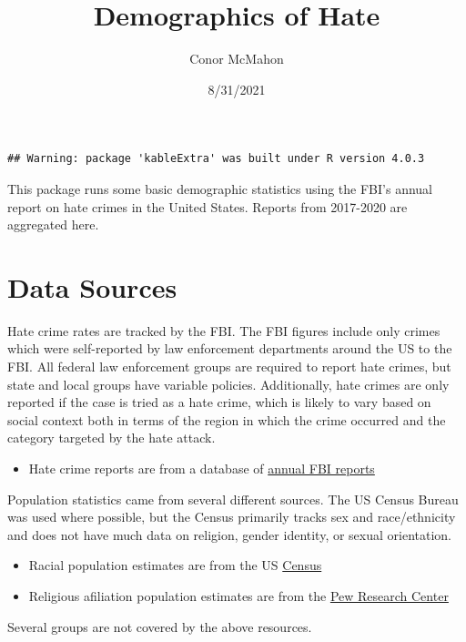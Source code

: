 \documentclass[
]{article}
\title{Demographics of Hate}
\author{Conor McMahon}
\date{8/31/2021}
\providecommand{\tightlist}{%
  \setlength{\itemsep}{0pt}\setlength{\parskip}{0pt}}
\begin{document}
\maketitle

\begin{verbatim}
## Warning: package 'kableExtra' was built under R version 4.0.3
\end{verbatim}

This package runs some basic demographic statistics using the FBI's
annual report on hate crimes in the United States. Reports from
2017-2020 are aggregated here.

\hypertarget{data-sources}{%
\section{Data Sources}\label{data-sources}}

Hate crime rates are tracked by the FBI. The FBI figures include only
crimes which were self-reported by law enforcement departments around
the US to the FBI. All federal law enforcement groups are required to
report hate crimes, but state and local groups have variable policies.
Additionally, hate crimes are only reported if the case is tried as a
hate crime, which is likely to vary based on social context both in
terms of the region in which the crime occurred and the category
targeted by the hate attack.

\begin{itemize}
\tightlist
\item
  Hate crime reports are from a database of
  \href{https://crime-data-explorer.fr.cloud.gov/pages/home}{annual FBI
  reports}
\end{itemize}

Population statistics came from several different sources. The US Census
Bureau was used where possible, but the Census primarily tracks sex and
race/ethnicity and does not have much data on religion, gender identity,
or sexual orientation.

\begin{itemize}
\tightlist
\item
  Racial population estimates are from the US
  \href{https://www.census.gov/quickfacts/fact/table/US/PST045219}{Census}
\item
  Religious afiliation population estimates are from the
  \href{https://www.pewforum.org/religious-landscape-study}{Pew Research
  Center}
\end{itemize}

Several groups are not covered by the above resources.
\end{document}

